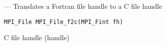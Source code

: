\startmanpage
{}
--- Translates a Fortran file handle to a C file handle 
\startvb\begin{verbatim}
MPI_File MPI_File_f2c(MPI_Fint fh)

\end{verbatim}
\endvb

\par
{}
C file handle (handle)
\endmanpage
